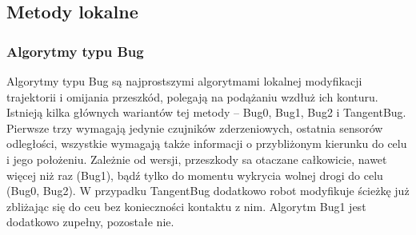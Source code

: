 \subsection{Metody lokalne}

\subsubsection{Algorytmy typu Bug}

Algorytmy typu Bug są najprostszymi algorytmami lokalnej modyfikacji
trajektorii i omijania przeszkód, polegają na podążaniu wzdłuż ich konturu.
Istnieją kilka głównych wariantów tej metody -- Bug0, Bug1, Bug2 i TangentBug.
Pierwsze trzy wymagają jedynie czujników zderzeniowych, ostatnia sensorów odległości,
wszystkie wymagają także informacji o przybliżonym kierunku do celu i jego położeniu.
Zależnie od wersji, przeszkody sa otaczane całkowicie, nawet więcej niż raz (Bug1),
bądź tylko do momentu wykrycia wolnej drogi do celu (Bug0, Bug2). W przypadku TangentBug
dodatkowo robot modyfikuje ścieżkę już zbliżając się do ceu bez konieczności kontaktu
z nim. Algorytm Bug1 jest dodatkowo zupełny, pozostałe nie.


